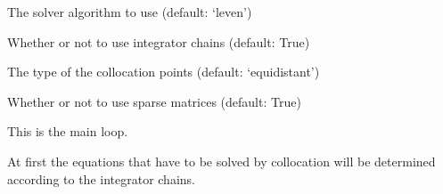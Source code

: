 \documentclass[letterpaper,10pt,english]{sphinxmanual}
\begin{document}
\begin{fulllineitems}
\begin{fulllineitems}
\end{fulllineitems}


\begin{fulllineitems}
\label{pytrajectory:pytrajectory.trajectory.Trajectory.algo}
The solver algorithm to use (default: `leven')

\end{fulllineitems}


\begin{fulllineitems}
\label{pytrajectory:pytrajectory.trajectory.Trajectory.use_chains}
Whether or not to use integrator chains (default: True)

\end{fulllineitems}


\begin{fulllineitems}
\label{pytrajectory:pytrajectory.trajectory.Trajectory.colltype}
The type of the collocation points (default: `equidistant')

\end{fulllineitems}


\begin{fulllineitems}
\label{pytrajectory:pytrajectory.trajectory.Trajectory.use_sparse}
Whether or not to use sparse matrices (default: True)

\end{fulllineitems}


\begin{fulllineitems}
\label{pytrajectory:pytrajectory.trajectory.Trajectory.startIteration}
This is the main loop.

At first the equations that have to be solved by collocation will be
determined according to the integrator chains.


\end{fulllineitems}
\end{fulllineitems}
\end{document}
